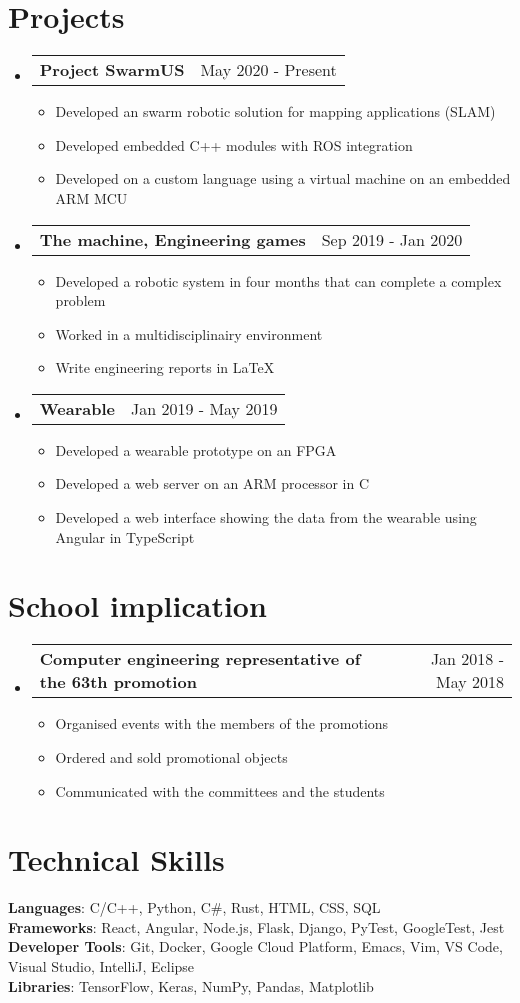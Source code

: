 \documentclass[letterpaper,11pt]{article}
\makeatletter
\newcommand{\resumeItem}[1]{
  \item\small{
    {#1 \vspace{-2pt}}
  }
}
\newcommand{\resumeProjectHeading}[2]{
    \item
    \begin{tabular*}{0.97\textwidth}{l@{\extracolsep{\fill}}r}
      \small\textbf{#1} & #2 \\
    \end{tabular*}\vspace{-7pt}
}
\newcommand{\resumeSubHeadingListStart}{\begin{itemize}[leftmargin=0.15in, label={}]}
\newcommand{\resumeSubHeadingListEnd}{\end{itemize}}
\newcommand{\resumeItemListStart}{\begin{itemize}}
\newcommand{\resumeItemListEnd}{\end{itemize}\vspace{-5pt}}
\makeatother
\begin{document}
\section{Projects}
    \resumeSubHeadingListStart
      \resumeProjectHeading
          {Project SwarmUS}{May 2020 - Present}
          \resumeItemListStart
            \resumeItem{Developed an swarm robotic solution for mapping applications (SLAM)}
            \resumeItem{Developed embedded C++ modules with ROS integration}
            \resumeItem{Developed on a custom language using a virtual machine on an embedded ARM MCU}
          \resumeItemListEnd
      \resumeProjectHeading
          {The machine, Engineering games}{Sep 2019 - Jan 2020}
          \resumeItemListStart
            \resumeItem{Developed a robotic system in four months that can complete a complex problem}
            \resumeItem{Worked in a multidisciplinairy environment}
            \resumeItem{Write engineering reports in LaTeX}
          \resumeItemListEnd
      \resumeProjectHeading
          {Wearable}{Jan 2019 - May 2019}
          \resumeItemListStart
            \resumeItem{Developed a wearable prototype on an FPGA}
            \resumeItem{Developed a web server on an ARM processor in C}
            \resumeItem{Developed a web interface showing the data from the wearable using Angular in TypeScript}
          \resumeItemListEnd
    \resumeSubHeadingListEnd

\section{School implication}
    \resumeSubHeadingListStart
      \resumeProjectHeading
          {Computer engineering representative of the 63th promotion}{Jan 2018 - May 2018}
          \resumeItemListStart
            \resumeItem{Organised events with the members of the promotions}
            \resumeItem{Ordered and sold promotional objects}
            \resumeItem{Communicated with the committees and the students}
          \resumeItemListEnd
    \resumeSubHeadingListEnd

%
\section{Technical Skills}
 \begin{itemize}[leftmargin=0.15in, label={}]
    \small{\item{
     \textbf{Languages}{: C/C++, Python, C\#, Rust, HTML, CSS, SQL} \\
     \textbf{Frameworks}{: React, Angular, Node.js, Flask, Django, PyTest, GoogleTest, Jest} \\
     \textbf{Developer Tools}{: Git, Docker, Google Cloud Platform, Emacs, Vim, VS Code, Visual Studio, IntelliJ, Eclipse} \\
     \textbf{Libraries}{: TensorFlow, Keras, NumPy, Pandas, Matplotlib}
    }}
 \end{itemize}


\end{document}
